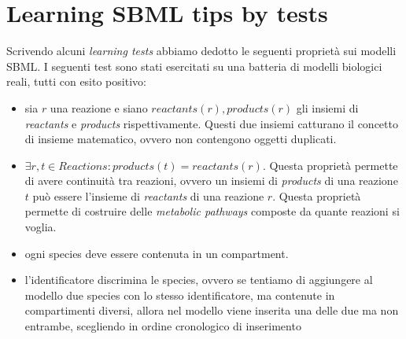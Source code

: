\section{Learning SBML tips by tests}

Scrivendo alcuni \emph{learning tests} abbiamo dedotto le seguenti
propriet\`a sui modelli SBML. I seguenti test sono stati esercitati su
una batteria di modelli biologici reali, tutti con esito positivo:
\begin{itemize}
\item sia $r$ una reazione e siano $reactants(r), products(r)$ gli
  insiemi di \emph{reactants} e \emph{products}
  rispettivamente. Questi due insiemi catturano il concetto di insieme
  matematico, ovvero non contengono oggetti duplicati.
\item $\exists r,t \in Reactions: products(t) = reactants(r)$. Questa
  propriet\`a permette di avere continuit\`a tra reazioni, ovvero un
  insiemi di \emph{products} di una reazione $t$ pu\`o essere
  l'insieme di \emph{reactants} di una reazione $r$. Questa
  propriet\`a permette di costruire delle \emph{metabolic pathways}
  composte da quante reazioni si voglia.
\item ogni species deve essere contenuta in un compartment.
\item l'identificatore discrimina le species, ovvero se tentiamo di
  aggiungere al modello due species con lo stesso identificatore, ma
  contenute in compartimenti diversi, allora nel modello viene
  inserita una delle due ma non entrambe, scegliendo in ordine
  cronologico di inserimento
\end{itemize}